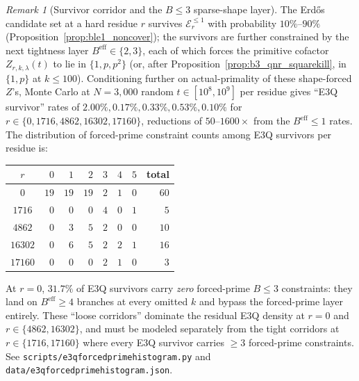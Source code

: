 \documentclass[11pt]{article}
\renewcommand{\_}{\origunderscore\allowbreak}
\theoremstyle{definition}
\theoremstyle{remark}
\newtheorem{remark}[theorem]{Remark}
\begin{document}
\begin{remark}[Survivor corridor and the $B\le 3$ sparse-shape layer]\label{rem:survivor_corridor}
The Erd\H{o}s candidate set at a hard residue $r$ survives
$\mathcal E_{r}^{\le 1}$ with probability $10\%$--$90\%$
(Proposition~\ref{prop:ble1_noncover}); the survivors are further
constrained by the next tightness layer
$B^{\mathrm{eff}}\in\{2,3\}$, each of which forces the primitive
cofactor $Z_{r,k,\lambda}(t)$ to lie in $\{1,p,p^2\}$ (or, after
Proposition~\ref{prop:b3_qnr_squarekill}, in $\{1,p\}$ at $k\le 100$).
Conditioning further on actual-primality of these shape-forced $Z$'s,
Monte Carlo at $N=3{,}000$ random $t\in[10^8,10^9]$ per residue
gives ``E3Q survivor'' rates of $2.00\%, 0.17\%, 0.33\%, 0.53\%, 0.10\%$
for $r\in\{0,1716,4862,16302,17160\}$, reductions of $50$--$1600\times$
from the $B^{\mathrm{eff}}\le 1$ rates.  The distribution of forced-prime
constraint counts among E3Q survivors per residue is:

\begin{center}
\begin{tabular}{c|rrrrrr|r}
\hline
$r$ & $0$ & $1$ & $2$ & $3$ & $4$ & $5$ & total \\
\hline
$0$      & $19$ & $19$ & $19$ & $2$ & $1$ & $0$ & $60$ \\
$1716$   & $0$  & $0$  & $0$  & $4$ & $0$ & $1$ & $5$ \\
$4862$   & $0$  & $3$  & $5$  & $2$ & $0$ & $0$ & $10$ \\
$16302$  & $0$  & $6$  & $5$  & $2$ & $2$ & $1$ & $16$ \\
$17160$  & $0$  & $0$  & $0$  & $2$ & $1$ & $0$ & $3$ \\
\hline
\end{tabular}
\end{center}

\noindent At $r=0$, $31.7\%$ of E3Q survivors carry \emph{zero} forced-prime
$B\le 3$ constraints: they land on $B^{\mathrm{eff}}\ge 4$ branches at
every omitted $k$ and bypass the forced-prime layer entirely.  These
``loose corridors'' dominate the residual E3Q density at $r=0$ and
$r\in\{4862,16302\}$, and must be modeled separately from the tight
corridors at $r\in\{1716,17160\}$ where every E3Q survivor carries
$\ge 3$ forced-prime constraints.  See
\texttt{scripts/e3q\_forced\_prime\_histogram.py} and
\texttt{data/e3q\_forced\_prime\_histogram.json}.
\end{remark}
\end{document}
